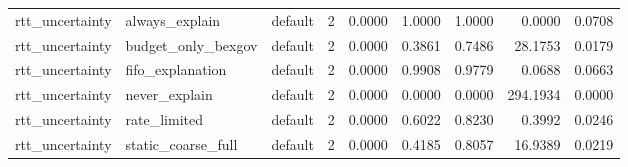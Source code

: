 \begin{table}[t]
\begin{tabular}{lllrrrrrr}
rtt\_uncertainty & always\_explain & default & 2 & 0.0000 & 1.0000 & 1.0000 & 0.0000 & 0.0708 \\
rtt\_uncertainty & budget\_only\_bexgov & default & 2 & 0.0000 & 0.3861 & 0.7486 & 28.1753 & 0.0179 \\
rtt\_uncertainty & fifo\_explanation & default & 2 & 0.0000 & 0.9908 & 0.9779 & 0.0688 & 0.0663 \\
rtt\_uncertainty & never\_explain & default & 2 & 0.0000 & 0.0000 & 0.0000 & 294.1934 & 0.0000 \\
rtt\_uncertainty & rate\_limited & default & 2 & 0.0000 & 0.6022 & 0.8230 & 0.3992 & 0.0246 \\
rtt\_uncertainty & static\_coarse\_full & default & 2 & 0.0000 & 0.4185 & 0.8057 & 16.9389 & 0.0219 \\
\bottomrule
\end{tabular}
\end{table}
